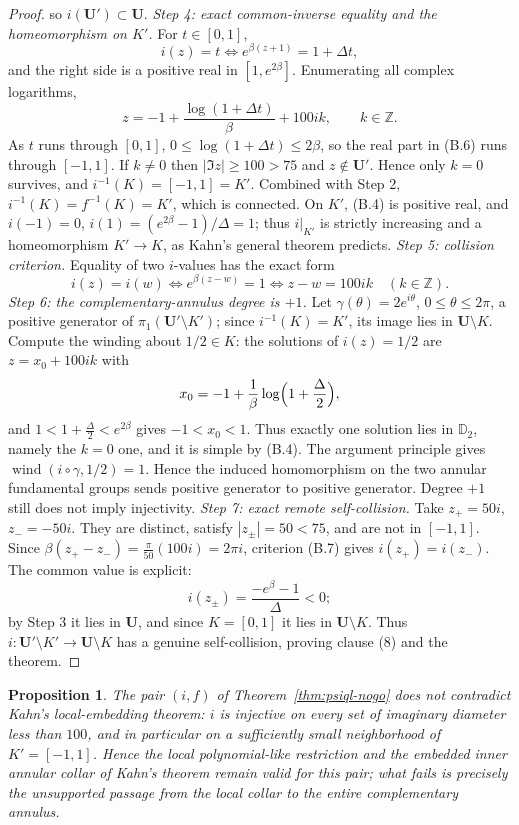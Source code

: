 \documentclass[11pt,reqno]{amsart}
\newtheorem{proposition}[theorem]{Proposition}
\theoremstyle{definition}
\theoremstyle{remark}
\begin{document}
\begin{proof}
so \(i(\mathbf U')\subset\mathbf U\).
\emph{Step 4: exact common-inverse equality and the homeomorphism on \(K'\).} For \(t\in[0,1]\),
\[ i(z)=t\iff e^{\beta(z+1)}=1+\Delta t, \]
and the right side is a positive real in \([1,e^{2\beta}]\). Enumerating all complex logarithms,
\[ z=-1+\frac{\log(1+\Delta t)}{\beta}+100ik,\qquad k\in\mathbb Z. \tag{B.6} \]
As \(t\) runs through \([0,1]\), \(0\le\log(1+\Delta t)\le2\beta\), so the real part in (B.6) runs through \([-1,1]\). If \(k\ne0\) then \(|\Im z|\ge100>75\) and \(z\notin\mathbf U'\). Hence only \(k=0\) survives, and \(i^{-1}(K)=[-1,1]=K'\). Combined with Step 2, \(i^{-1}(K)=f^{-1}(K)=K'\), which is connected. On \(K'\), (B.4) is positive real, and \(i(-1)=0\), \(i(1)=(e^{2\beta}-1)/\Delta=1\); thus \(i|_{K'}\) is strictly increasing and a homeomorphism \(K'\to K\), as Kahn's general theorem predicts.
\emph{Step 5: collision criterion.} Equality of two \(i\)-values has the exact form
\[ i(z)=i(w)\iff e^{\beta(z-w)}=1\iff z-w=100ik\quad(k\in\mathbb Z). \tag{B.7} \]
\emph{Step 6: the complementary-annulus degree is \(+1\).} Let \(\gamma(\theta)=2e^{i\theta}\), \(0\le\theta\le2\pi\), a positive generator of \(\pi_1(\mathbf U'\setminus K')\); since \(i^{-1}(K)=K'\), its image lies in \(\mathbf U\setminus K\). Compute the winding about \(1/2\in K\): the solutions of \(i(z)=1/2\) are \(z=x_0+100ik\) with
\[ x_0=-1+\frac{1}{\beta}\log\Bigl(1+\frac{\Delta}{2}\Bigr), \]
and \(1<1+\tfrac{\Delta}{2}<e^{2\beta}\) gives \(-1<x_0<1\). Thus exactly one solution lies in \(\mathbb D_2\), namely the \(k=0\) one, and it is simple by (B.4). The argument principle gives \(\operatorname{wind}(i\circ\gamma,1/2)=1\). Hence the induced homomorphism on the two annular fundamental groups sends positive generator to positive generator. Degree \(+1\) still does not imply injectivity.
\emph{Step 7: exact remote self-collision.} Take \(z_{+}=50i\), \(z_{-}=-50i\). They are distinct, satisfy \(|z_{\pm}|=50<75\), and are not in \([-1,1]\). Since \(\beta(z_{+}-z_{-})=\tfrac{\pi}{50}(100i)=2\pi i\), criterion (B.7) gives \(i(z_{+})=i(z_{-})\). The common value is explicit:
\[ i(z_{\pm})=\frac{-e^{\beta}-1}{\Delta}<0; \]
by Step 3 it lies in \(\mathbf U\), and since \(K=[0,1]\) it lies in \(\mathbf U\setminus K\). Thus \(i:\mathbf U'\setminus K'\to\mathbf U\setminus K\) has a genuine self-collision, proving clause (8) and the theorem.
\end{proof}
\begin{proposition}\label{prop:local-compat}
The pair \((i,f)\) of Theorem~\ref{thm:psiql-nogo} does not contradict Kahn's local-embedding theorem: \(i\) is injective on every set of imaginary diameter less than \(100\), and in particular on a sufficiently small neighborhood of \(K'=[-1,1]\). Hence the local polynomial-like restriction and the embedded inner annular collar of Kahn's theorem remain valid for this pair; what fails is precisely the unsupported passage from the local collar to the entire complementary annulus.
\end{proposition}
\end{document}
